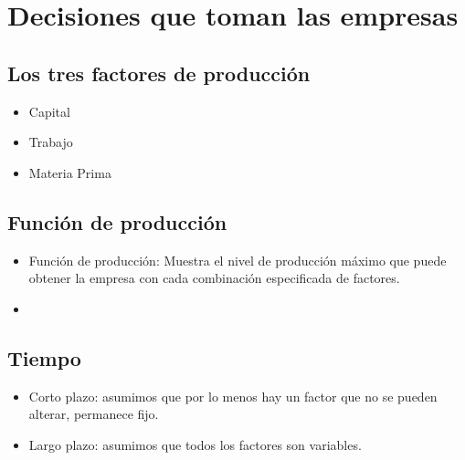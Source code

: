 \section{Decisiones que toman las empresas}



\subsection{Los tres factores de producción}
\begin{itemize}
    \item Capital 
    \item Trabajo
    \item Materia Prima 
\end{itemize}


\subsection{Función de producción}
\begin{itemize}
    \item Función de producción: Muestra el nivel de producción máximo que puede obtener la empresa con cada combinación especificada de factores. 
    \item 
\end{itemize}


\subsection{Tiempo}
\begin{itemize}
    \item Corto plazo: asumimos que por lo menos hay un factor que no se pueden alterar, permanece fijo.
    \item Largo plazo: asumimos que todos los factores son variables.
\end{itemize}



